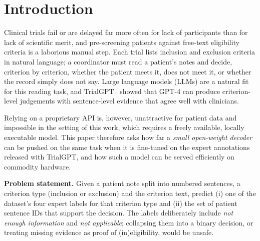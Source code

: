 \section{Introduction}
\label{sec:intro}

Clinical trials fail or are delayed far more often for lack of participants than for lack of
scientific merit, and pre-screening patients against free-text eligibility criteria is a laborious
manual step. Each trial lists inclusion and exclusion criteria in natural language; a coordinator must
read a patient's notes and decide, criterion by criterion, whether the patient meets it, does not meet
it, or whether the record simply does not say. Large language models (LLMs) are a natural fit for this
reading task, and TrialGPT~\cite{jin2024trialgpt} showed that GPT-4 can produce criterion-level
judgements with sentence-level evidence that agree well with clinicians.

Relying on a proprietary API is, however, unattractive for patient data and impossible in the
setting of this work, which requires a freely available, locally executable model. This paper
therefore asks how far a \emph{small open-weight decoder} can be pushed on the same task when it is
fine-tuned on the expert annotations released with TrialGPT, and how such a model can be served
efficiently on commodity hardware.

\textbf{Problem statement.} Given a patient note split into numbered sentences, a criterion type
(inclusion or exclusion) and the criterion text, predict (i) one of the dataset's four expert labels
for that criterion type and (ii) the set of patient sentence IDs that support the decision. The
labels deliberately include \emph{not enough information} and \emph{not applicable}; collapsing them
into a binary decision, or treating missing evidence as proof of (in)eligibility, would be unsafe.

